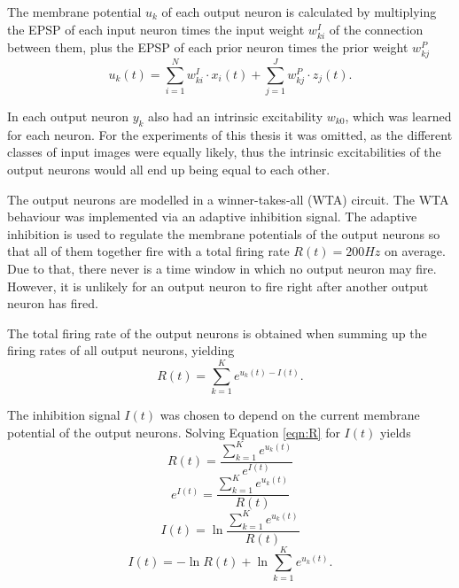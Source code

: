 The membrane potential $u_k$ of each output neuron is calculated by multiplying the EPSP of each input neuron times the input weight $w^{I}_{ki}$ of the connection between them, plus the EPSP of each prior neuron times the prior weight $w^{P}_{kj}$
\begin{equation}
\label{eqn:uk}
u_k(t) = \sum_{i=1}^N w^{I}_{ki} \cdot x_i(t) + \sum_{j=1}^J w^{P}_{kj} \cdot z_j(t).
\end{equation}

In \citet{nessler} each output neuron $y_k$ also had an intrinsic excitability $w_{k0}$, which was learned for each neuron. For the experiments of this thesis it was omitted, as the different classes of  input images were equally likely, thus the intrinsic excitabilities of the output neurons would all end up being equal to each other.

The output neurons are modelled in a winner-takes-all (WTA) circuit. The WTA behaviour was implemented via an adaptive inhibition signal. The adaptive inhibition is used to regulate the membrane potentials of the output neurons so that all of them together fire with a total firing rate $R(t) = 200 Hz$ on average. Due to that, there never is a time window in which no output neuron may fire. However, it is unlikely for an output neuron to fire right after another output neuron has fired.

The total firing rate of the output neurons is obtained when summing up the firing rates of all output neurons, yielding 
\begin{equation}
\label{eqn:R}
R(t) = \sum_{k=1}^K e^{u_k(t) - I(t)}.
\end{equation}

The inhibition signal $I(t)$ was chosen to depend on the current membrane potential of the output neurons. 
Solving Equation \ref{eqn:R} for $I(t)$ yields
\begin{equation}
\label{}
R(t) = \frac{ \sum_{k=1}^K e^{u_k(t)}}{e^{I(t)}}
\end{equation}
\begin{equation}
\label{}
e^{I(t)} = \frac{\sum_{k=1}^K e^{u_k(t)}}{R(t)}
\end{equation}
\begin{equation}
\label{}
I(t) = \ln{ \frac{ \sum_{k=1}^K e^{u_k(t)}}{R(t)}}
\end{equation}
\begin{equation}
\label{eqn:I(t)}
I(t) =  - \ln{R(t)} + \ln{  \sum_{k=1}^K e^{u_k(t)}}.
\end{equation}

